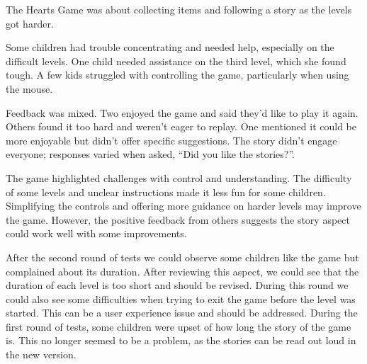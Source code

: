The Hearts Game was about collecting items and following a story as the levels got harder.

Some children had trouble concentrating and needed help, especially on the difficult levels. One child needed assistance on the third level, which she found tough. A few kids struggled with controlling the game, particularly when using the mouse.

Feedback was mixed. Two enjoyed the game and said they’d like to play it again. Others found it too hard and weren’t eager to replay. One mentioned it could be more enjoyable but didn’t offer specific suggestions. The story didn’t engage everyone; responses varied when asked, ``Did you like the stories?''.

The game highlighted challenges with control and understanding. The difficulty of some levels and unclear instructions made it less fun for some children. Simplifying the controls and offering more guidance on harder levels may improve the game. However, the positive feedback from others suggests the story aspect could work well with some improvements.

After the second round of tests we could observe some children like the game but complained about its duration. After reviewing this aspect, we could see that the duration of each level is too short and should be revised. During this round we could also see some difficulties when trying to exit the game before the level was started. This can be a user experience issue and should be addressed. During the first round of tests, some children were upset of how long the story of the game is. This no longer seemed to be a problem, as the stories can be read out loud in the new version.




